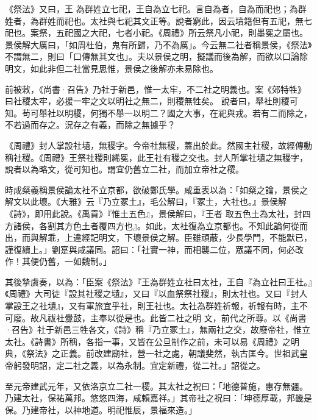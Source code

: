 \begin{pinyinscope}
 《祭法》又曰，王
 為群姓立七祀，王自為立七祀。言自為者，自為而祀也；為群姓者，為群姓而祀也。太社與七祀其文正等。說者窮此，因云墳籍但有五祀，無七祀也。案祭，五祀國之大祀，七者小祀。《周禮》所云祭凡小祀，則墨冕之屬也。景侯解大厲曰，「如周杜伯，鬼有所歸，乃不為厲」。今云無二社者稱景侯，《祭法》不謂無二，則曰「口傳無其文也」。夫以景侯之明，擬議而後為解，而欲以口論除明文，如此非但二社當見思惟，景侯之後解亦未易除也。



 前被敕，《尚書·召告》乃社于新邑，惟一太牢，不二社之明義也。案《郊特牲》曰社稷太牢，必援一牢之文以明社之無二，則稷無牲矣。
 說者曰，舉社則稷可知。茍可舉社以明稷，何獨不舉一以明二？國之大事，在祀與戎。若有二而除之，不若過而存之。況存之有義，而除之無據乎？



 《周禮》封人掌設社壝，無稷字。今帝社無稷，蓋出於此。然國主社稷，故經傳動稱社稷。《周禮》王祭社稷則絺冕，此王社有稷之交也。封人所掌社壝之無稷字，說者以為略文，從可知也。謂宜仍舊立二社，而加立帝社之稷。



 時成粲義稱景侯論太社不立京都，欲破鄭氏學。咸重表以為：「如粲之論，景侯之解文以此壞。《大雅》云『乃立冢土』，毛公解曰，『冢土，大社也。』景侯解《詩》，即用此說。《禹貢》『惟土五色』，景侯解曰，『王者
 取五色土為太社，封四方諸侯，各割其方色土者覆四方也』。如此，太社復為立京都也。不知此論何從而出，而與解乖，上違經記明文，下壞景侯之解。臣雖頑蔽，少長學門，不能默已，謹復續上。」劉寔與咸議同。詔曰：「社實一神，而相襲二位，眾議不同，何必改作！其便仍舊，一如魏制。」



 其後摯虞奏，以為：「臣案《祭法》『王為群姓立社曰太社，王自『為立社曰王社。』《周禮》大司徒『設其社稷之壝』，又曰『以血祭祭社稷』，則太社也。又曰『封人掌設王之社壝』，又有軍旅宜乎社，則王社也。太社為群姓祈報，祈報有時，主不可廢。故凡祓社釁鼓，主奉以從是也。此皆二社之明
 文，前代之所尊。以《尚書·召告》社于新邑三牲各文，《詩》稱『乃立冢土』，無兩社之交，故廢帝社，惟立太社。《詩書》所稱，各指一事，又皆在公旦制作之前，未可以易《周禮》之明典，《祭法》之正義。前改建廟社，營一社之處，朝議斐然，執古匡今。世祖武皇帝躬發明詔，定二社之義，以為永制。宜定新禮，從二社。」詔從之。



 至元帝建武元年，又依洛京立二社一稷。其太社之祝曰：「地德普施，惠存無疆。乃建太社，保祐萬邦。悠悠四海，咸賴嘉祥。」其帝社之祝曰：「坤德厚載，邦畿是保。乃建帝社，以神地道。明祀惟辰，景福來造。」




\end{pinyinscope}
